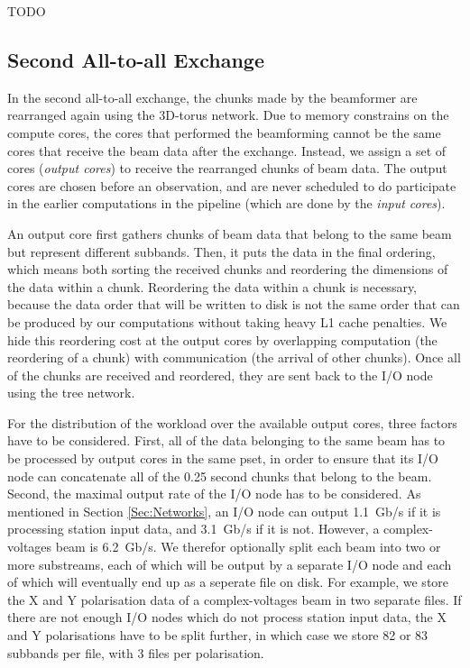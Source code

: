 \documentclass{llncs}
\begin{document}
TODO

\subsection{Second All-to-all Exchange}

In the second all-to-all exchange, the chunks made by the beamformer are rearranged again using the 3D-torus network. Due to memory constrains on the compute cores, the cores that performed the beamforming cannot be the same cores that receive the beam data after the exchange. Instead, we assign a set of cores (\emph{output cores}) to receive the rearranged chunks of beam data. The output cores are chosen before an observation, and are never scheduled to do participate in the earlier computations in the pipeline (which are done by the \emph{input cores}).

An output core first gathers chunks of beam data that belong to the same beam but represent different subbands. Then, it puts the data in the final ordering, which means both sorting the received chunks and reordering the dimensions of the data within a chunk. Reordering the data within a chunk is necessary, because the data order that will be written to disk is not the same order that can be produced by our computations without taking heavy L1 cache penalties. We hide this reordering cost at the output cores by overlapping computation (the reordering of a chunk) with communication (the arrival of other chunks). Once all of the chunks are received and reordered, they are sent back to the I/O node using the tree network.

For the distribution of the workload over the available output cores, three factors have to be considered. First, all of the data belonging to the same beam has to be processed by output cores in the same pset, in order to ensure that its I/O node can concatenate all of the 0.25 second chunks that belong to the beam. Second, the maximal output rate of the I/O node has to be considered. As mentioned in Section \ref{Sec:Networks}, an I/O node can output 1.1~Gb/s if it is processing station input data, and 3.1~Gb/s if it is not. However, a complex-voltages beam is 6.2~Gb/s. We therefor optionally split each beam into two or more substreams, each of which will be output by a separate I/O node and each of which will eventually end up as a seperate file on disk. For example, we store the X and Y polarisation data of a complex-voltages beam in two separate files. If there are not enough I/O nodes which do not process station input data, the X and Y polarisations have to be split further, in which case we store 82 or 83 subbands per file, with 3 files per polarisation.
\end{document}
